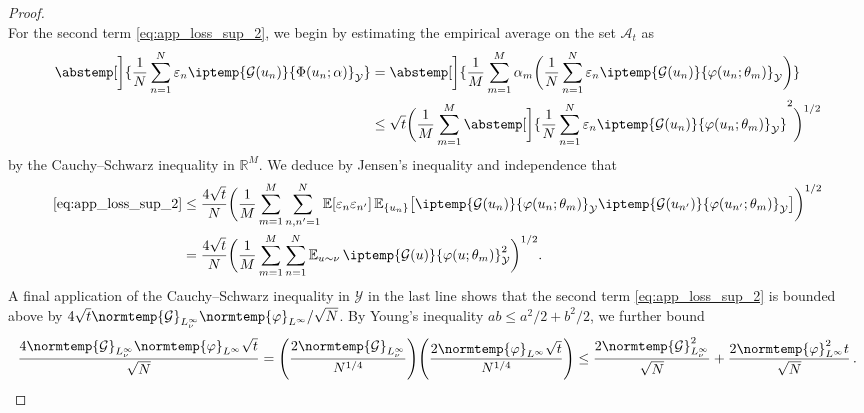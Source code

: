 \documentclass{article}
\theoremstyle{plain}
\theoremstyle{my_def}
\theoremstyle{my_rem}
\numberwithin{equation}{section}
\numberwithin{theorem}{section}%
\newcommand{\R}{\mathbb{R}}
\newcommand{\E}{\mathbb{E}}
\newcommand{\cA}{\mathcal{A}}
\newcommand{\cG}{\mathcal{G}}
\newcommand{\cY}{\mathcal{Y}}
\let\originalleft\left %
\let\originalright\right
\renewcommand{\left}{\mathopen{}\mathclose\bgroup\originalleft}
\renewcommand{\right}{\aftergroup\egroup\originalright}
\newcommand{\ip}{\iptemp}
\newcommand{\norm}{\normtemp}
\newcommand{\abs}{\abstemp}
\renewcommand{\E}{\operatorname{\mathbb{E}}} %
\newcommand{\al}{\alpha}
\newcommand{\U}{{\{u_n\}}}
\newcommand{\eps}{\varepsilon}
\renewcommand{\phi}{\varphi}
\begin{document}
\begin{proof}
\begin{equation*}
    \end{equation*}
    For the second term \eqref{eq:app_loss_sup_2}, we begin by estimating the empirical average on the set $\cA_t$ as
    \begin{align*}
        \abs[\bigg]{\frac{1}{N}\sum_{n=1}^N\eps_n\ip{\cG(u_n)}{\Phi(u_n;\al)}_{\cY}} &= \abs[\bigg]{\frac{1}{M}\sum_{m=1}^M\al_m\biggl(\frac{1}{N}\sum_{n=1}^N \eps_n\ip{\cG(u_n)}{\phi(u_n;\theta_m)}_{\cY}\biggr)}\\
        &\leq \sqrt{t}\biggl(\frac{1}{M}\sum_{m=1}^M\abs[\bigg]{\frac{1}{N}\sum_{n=1}^N\eps_n\ip{\cG(u_n)}{\phi(u_n;\theta_m)}_{\cY}}^2\biggr)^{1/2}
    \end{align*}
    by the Cauchy--Schwarz inequality in $\R^M$. We deduce by Jensen's inequality and independence that
    \begin{align*}
         \eqref{eq:app_loss_sup_2}&\leq\frac{4\sqrt{t}}{N}\biggl(\frac{1}{M}\sum_{m=1}^M\sum_{n,n'=1}^N\E[\eps_n\eps_{n'}]\E_{\U}\bigl[\ip{\cG(u_n)}{\phi(u_n;\theta_m)}_{\cY}\ip{\cG(u_{n'})}{\phi(u_{n'};\theta_m)}_{\cY}\bigr]\biggr)^{1/2}\\
         &=\frac{4\sqrt{t}}{N}\biggl(\frac{1}{M}\sum_{m=1}^M\sum_{n=1}^N\E_{u\sim\nu}\ip{\cG(u)}{\phi(u;\theta_m)}_{\cY}^2\biggr)^{1/2}.
    \end{align*}
    A final application of the Cauchy--Schwarz inequality in $\cY$ in the last line shows that the second term \eqref{eq:app_loss_sup_2} is bounded above by $4\sqrt{t}\norm{\cG}_{L^\infty_\nu}\norm{\phi}_{L^\infty}/\sqrt{N}$.
    By Young's inequality $ab\leq a^2/2 + b^2/2$, we further bound
    \begin{equation*}
        \frac{4\norm{\cG}_{L^\infty_\nu}\norm{\phi}_{L^\infty}\sqrt{t}}{\sqrt{N}} = \left(\frac{2\norm{\cG}_{L_\nu^\infty}}{N^{1/4}}\right)\left(\frac{2\norm{\phi}_{L^\infty}\sqrt{t}}{N^{1/4}}\right)
    \leq  \frac{2\norm{\cG}_{L_\nu^\infty}^2 }{\sqrt{N}} + \frac{2\norm{\phi}_{L^\infty}^2 t}{\sqrt{N}}\,.
    \end{equation*}


\end{proof}
\end{document}
